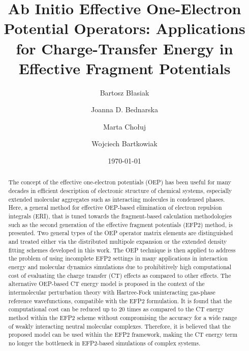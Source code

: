 \documentclass[aip,jcp,amsmath,amssymb,reprint,floatfix]{revtex4-1}
\begin{document}

\title{Ab Initio Effective One-Electron Potential Operators:
Applications for Charge-Transfer Energy in Effective Fragment Potentials}

\author{Bartosz B{\l}asiak}

\author{Joanna D. Bednarska}
\author{Marta Cho{\l}uj} 
\author{Wojciech Bartkowiak}


\date{\today}

\begin{abstract}
The concept of the effective one\hyp{}electron potentials (OEP) has been useful for many decades
in efficient description of electronic structure of chemical systems, especially extended
molecular aggregates such as interacting molecules in condensed phases.
Here, a general method for effective OEP\hyp{}based elimination of electron repulsion integrals (ERI),
that is tuned
towards the fragment\hyp{}based calculation methodologies
such as the second generation of the effective fragment potentials (EFP2) method,
is presented.
Two general types of the OEP operator matrix elements
are distinguished and treated either via the distributed multipole expansion
or the extended density fitting schemes developed in this work. 
The OEP technique is then applied
to address the problem of using incomplete EFP2 settings in many
applications in interaction energy and 
molecular dynamics simulations 
due to prohibitively high computational cost of evaluating the
charge transfer (CT) effects as compared to other effects.
The alternative OEP\hyp{}based CT energy model is proposed
in the context of the
intermolecular perturbation theory with Hartree\hyp{}Fock uninteracting gas\hyp{}phase 
reference wavefunctions, compatible with the EFP2 formulation.
It is found that the computational cost can be reduced
up to 20 times as compared to the CT energy method within the EFP2 scheme
without compromising the accuracy for a wide range of weakly interacting 
neutral molecular complexes. 
Therefore, it is believed that
the proposed model can be used within 
the EFP2 framework, making the CT energy term no longer the bottleneck
in EFP2\hyp{}based simulations of complex systems.
\end{abstract}
\end{document}
